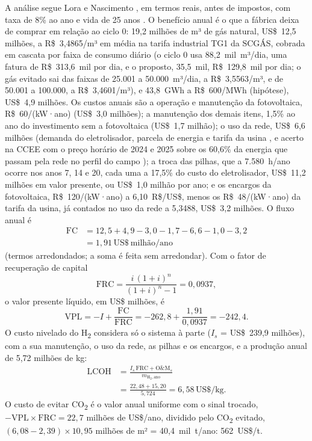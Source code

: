 \documentclass[10pt,a4paper,twocolumn]{article}
\newcommand{\Ht}{H\textsubscript{2}}
\newcommand{\COt}{CO\textsubscript{2}}
\newcommand{\un}[1]{\,\mathrm{#1}}
\begin{document}
A análise segue Lora e Nascimento \cite{lora2004}, em termos reais, antes de impostos, com taxa de 8\% ao ano e vida de 25 anos \cite{epe2025}. O benefício anual é o que a fábrica deixa de comprar em relação ao ciclo 0: 19,2 milhões de m³ de gás natural, US\$~12,5 milhões, a R\$~3,4865/m³ em média na tarifa industrial TG1 da SCGÁS, cobrada em cascata por faixa de consumo diário \cite{scgas2026} (o ciclo 0 usa 88,2~mil~m³/dia, uma fatura de R\$~313,6~mil por dia, e o proposto, 35,5~mil, R\$~129,8~mil por dia; o gás evitado sai das faixas de 25.001 a 50.000~m³/dia, a R\$~3,5563/m³, e de 50.001 a 100.000, a R\$~3,4601/m³), e 43,8~GWh a R\$~600/MWh (hipótese), US\$~4,9 milhões. Os custos anuais são a operação e manutenção da fotovoltaica, R\$~60/(kW·ano) \cite{epe2025} (US\$~3,0 milhões); a manutenção dos demais itens, 1,5\% ao ano do investimento sem a fotovoltaica \cite{lora2004} (US\$~1,7 milhão); o uso da rede, US\$~6,6 milhões (demanda do eletrolisador, parcela de energia e tarifa da usina \cite{aneel2026}, e acerto na CCEE com o preço horário de 2024 e 2025 \cite{ccee2025} sobre os 60,6\% da energia que passam pela rede no perfil do campo \cite{pvgis2026}); a troca das pilhas, que a 7.580~h/ano ocorre nos anos 7, 14 e 20, cada uma a 17,5\% do custo do eletrolisador, US\$~11,2 milhões em valor presente, ou US\$~1,0 milhão por ano; e os encargos da fotovoltaica, R\$~120/(kW·ano) \cite{epe2025} a 6,10~R\$/US\$, menos os R\$~48/(kW·ano) da tarifa da usina, já contados no uso da rede a 5,3488, US\$~3,2 milhões. O fluxo anual é
\begin{equation}
\begin{split}
\mathrm{FC} &= 12{,}5 + 4{,}9 - 3{,}0 - 1{,}7 - 6{,}6 - 1{,}0 - 3{,}2\\
&= 1{,}91\un{US\$\ milhão/ano}
\end{split} \label{eq:fc}
\end{equation}
(termos arredondados; a soma é feita sem arredondar). Com o fator de recuperação de capital
\begin{equation}
\mathrm{FRC} = \frac{i\,(1+i)^n}{(1+i)^n - 1} = 0{,}0937, \label{eq:frc}
\end{equation}
o valor presente líquido, em US\$ milhões, é
\begin{equation}
\mathrm{VPL} = -I + \frac{\mathrm{FC}}{\mathrm{FRC}} = -262{,}8 + \frac{1{,}91}{0{,}0937} = -242{,}4. \label{eq:vpl}
\end{equation}
O custo nivelado do \Ht{} considera só o sistema à parte ($I_s$ = US\$~239,9 milhões), com a sua manutenção, o uso da rede, as pilhas e os encargos, e a produção anual de 5,72 milhões de kg:
\begin{equation}
\begin{split}
\mathrm{LCOH} &= \frac{I_s\,\mathrm{FRC} + \mathrm{O\&M}_s}{m_{\mathrm{H_2},\text{ano}}}\\
&= \frac{22{,}48 + 15{,}20}{5{,}724} = 6{,}58\un{US\$/kg}.
\end{split} \label{eq:lcoh}
\end{equation}
O custo de evitar \COt{} é o valor anual uniforme com o sinal trocado, $-\mathrm{VPL} \times \mathrm{FRC} = 22{,}7$ milhões de US\$/ano, dividido pelo \COt{} evitado, $(6{,}08 - 2{,}39) \times 10{,}95$ milhões de m² = 40,4~mil~t/ano: 562~US\$/t.
\end{document}
